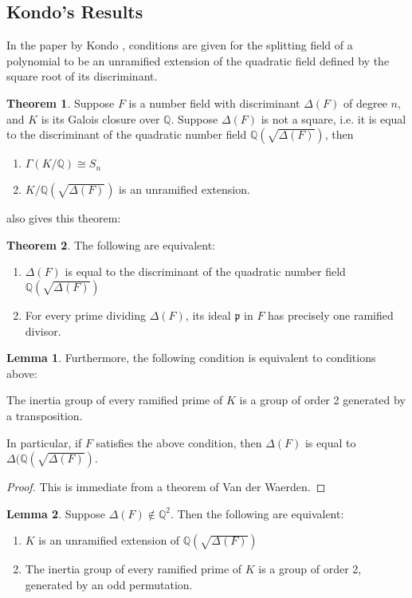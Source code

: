 \documentclass[12pt]{extarticle}
\newcommand{\Q}{\mathbb{Q}}
\newcommand{\<}{\langle}
\renewcommand{\>}{\rangle}
\theoremstyle{definition}
\newtheorem{theorem}{Theorem}
\newtheorem{lemma}{Lemma}
\begin{document}
\subsection{Kondo's Results}
In the paper by Kondo \cite{KOND}, conditions are given for the splitting field of a polynomial to be an unramified extension of the quadratic field defined by the square root of its discriminant.
\begin{theorem}
    Suppose $F$ is a number field with discriminant $\Delta(F)$ of degree $n$, and $K$ is its Galois closure over $\Q$. Suppose $\Delta(F)$ is not a square, i.e. it is equal to the discriminant of the quadratic number field $\Q(\sqrt{\Delta(F)})$, then \begin{enumerate}
        \item $\Gamma(K/\Q)\cong S_n$
        \item $K/\Q(\sqrt{\Delta(F)})$ is an unramified extension.
    \end{enumerate}
\end{theorem}
\cite{KOND} also gives this theorem: \begin{theorem}
    The following are equivalent: \begin{enumerate}
        \item $\Delta(F)$ is equal to the discriminant of the quadratic number field $\Q(\sqrt{\Delta(F)})$
        \item For every prime dividing $\Delta(F)$, its ideal $\mathfrak{p}$ in $F$ has precisely one ramified divisor.
    \end{enumerate}
\end{theorem}
\begin{lemma}
Furthermore, the following condition is equivalent to conditions above:
\par
    The inertia group of every ramified prime of $K$ is a group of order 2 generated by a transposition.\par
In particular, if $F$ satisfies the above condition, then $\Delta(F)$ is equal to $\Delta(\Q(\sqrt{\Delta(F)})$.
\end{lemma}
\begin{proof}
This is immediate from a theorem of Van der Waerden. 
\end{proof}
\begin{lemma}
Suppose $\Delta(F)\notin \Q^2$. Then the following are equivalent:\begin{enumerate}
    \item $K$ is an unramified extension of $\Q(\sqrt{\Delta(F)})$
    \item The inertia group of every ramified prime of $K$ is a group of order 2, generated by an odd permutation. 
\end{enumerate}
\end{lemma} 
\end{document}
